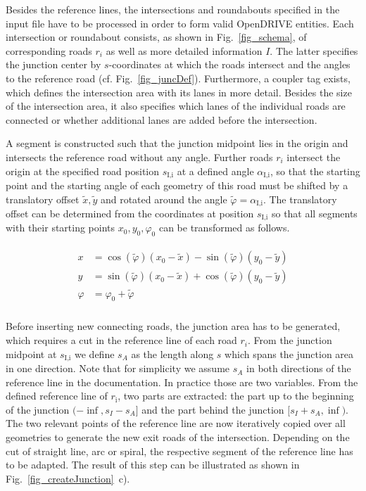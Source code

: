 \documentclass[a4paper, 10pt, conference]{ieeeconf}      %
\begin{document}
    Besides the reference lines, the intersections and roundabouts specified in the input file have to be processed in order to form valid OpenDRIVE entities. Each intersection or roundabout consists, as shown in Fig.~\ref{fig_schema}, of corresponding roads \(r_i\) as well as more detailed information \(I\). The latter specifies the junction center by $s$-coordinates at which the roads intersect and the angles to the reference road (cf. Fig.~\ref{fig_juncDef}). Furthermore, a coupler tag exists, which defines the intersection area with its lanes in more detail. Besides the size of the intersection area, it also specifies which lanes of the individual roads are connected or whether additional lanes are added before the intersection.

    A segment is constructed such that the junction midpoint lies in the origin and intersects the reference road without any angle. Further roads \(r_i\) intersect the origin at the specified road position \(s_\text{I,i}\) at a defined angle \(\alpha_\text{I,i}\), so that the starting point and the starting angle of each geometry of this road must be shifted by a translatory offset \(\tilde{x}, \tilde{y}\) and rotated around the angle \(\tilde{\varphi} = \alpha_\text{I,i}\). The translatory offset can be determined from the coordinates at position \(s_\text{I,i}\) so that all segments with their starting points \(x_0,y_0,\varphi_0\) can be transformed as follows.

    \begin{align} \label{eq_transform}
        \begin{split}
            x &= \cos(\tilde{\varphi}) \left(x_0-\tilde{x}\right) - \sin(\tilde{\varphi}) \left(y_0-\tilde{y}\right) \\
            y &= \sin(\tilde{\varphi}) \left(x_0-\tilde{x}\right) + \cos(\tilde{\varphi}) \left(y_0-\tilde{y}\right) \\
            \varphi &= \varphi_0 + \tilde{\varphi} \\
        \end{split}
    \end{align}

    Before inserting new connecting roads, the junction area has to be generated, which requires a cut in the reference line of each road $r_i$. From the junction midpoint at \(s_\text{I,i}\) we define \(s_A\) as the length along $s$ which spans the junction area in one direction. Note that for simplicity we assume \(s_A\) in both directions of the reference line in the documentation. In practice those are two variables. From the defined reference line of $r_\text{i}$, two parts are extracted: the part up to the beginning of the junction \((-\inf,s_I - s_A]\) and the part behind the junction \([s_I + s_A, \inf)\). The two relevant points of the reference line are now iteratively copied over all geometries to generate the new exit roads of the intersection. Depending on the cut of straight line, arc or spiral, the respective segment of the reference line has to be adapted. The result of this step can be illustrated as shown in Fig.~\ref{fig_createJunction}~c).
    
\end{document}

